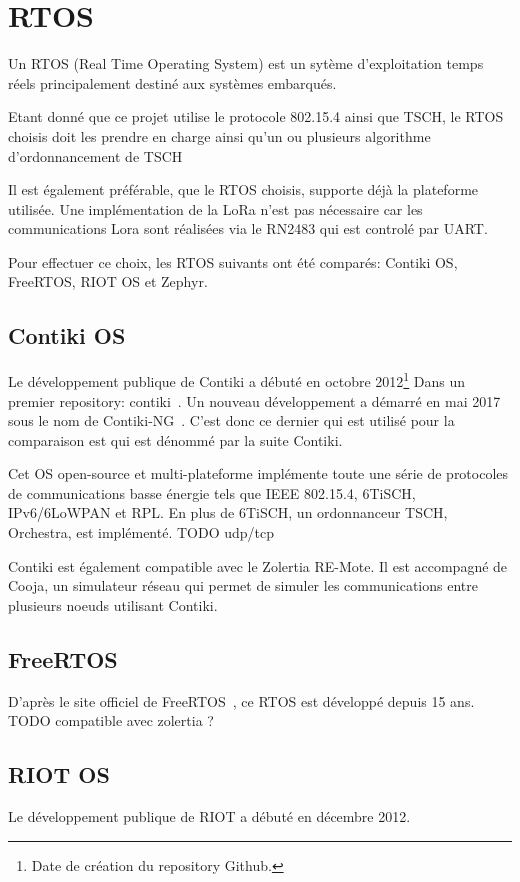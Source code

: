 \section{RTOS}

Un RTOS (Real Time Operating System) est un sytème d'exploitation temps réels principalement destiné aux systèmes embarqués.

Etant donné que ce projet utilise le protocole 802.15.4 ainsi que TSCH, le RTOS choisis doit les prendre en charge ainsi qu'un ou plusieurs algorithme d'ordonnancement de TSCH

Il est également préférable, que le RTOS choisis, supporte déjà la plateforme utilisée. Une implémentation de la LoRa n'est pas nécessaire car les communications Lora sont réalisées via le RN2483 qui est controlé par UART.

Pour effectuer ce choix, les RTOS suivants ont été comparés: Contiki OS, FreeRTOS, RIOT OS et Zephyr.

\subsection*{Contiki OS}
    Le développement publique de Contiki a débuté en octobre 2012\footnote{Date de création du repository Github.} Dans un premier repository: contiki~\cite{contiki-repo:old}. Un nouveau développement a démarré en mai 2017 sous le nom de Contiki-NG~\cite{contiki-repo:ng}. C'est donc ce dernier qui est utilisé pour la comparaison est qui est dénommé par la suite Contiki.

    Cet OS open-source et multi-plateforme implémente toute une série de protocoles de communications basse énergie tels que IEEE 802.15.4, 6TiSCH, IPv6/6LoWPAN et RPL. En plus de 6TiSCH, un ordonnanceur TSCH, Orchestra, est implémenté.
    TODO udp/tcp

    Contiki est également compatible avec le Zolertia RE-Mote. Il est accompagné de Cooja, un simulateur réseau qui permet de simuler les communications entre plusieurs noeuds utilisant Contiki.

\subsection*{FreeRTOS}
    D'après le site officiel de FreeRTOS~\cite{freertos}, ce RTOS est développé depuis 15 ans.
    TODO compatible avec zolertia ?

    \subsection*{RIOT OS}
    Le développement publique de RIOT a débuté en décembre 2012\footnotemark[1].
    
